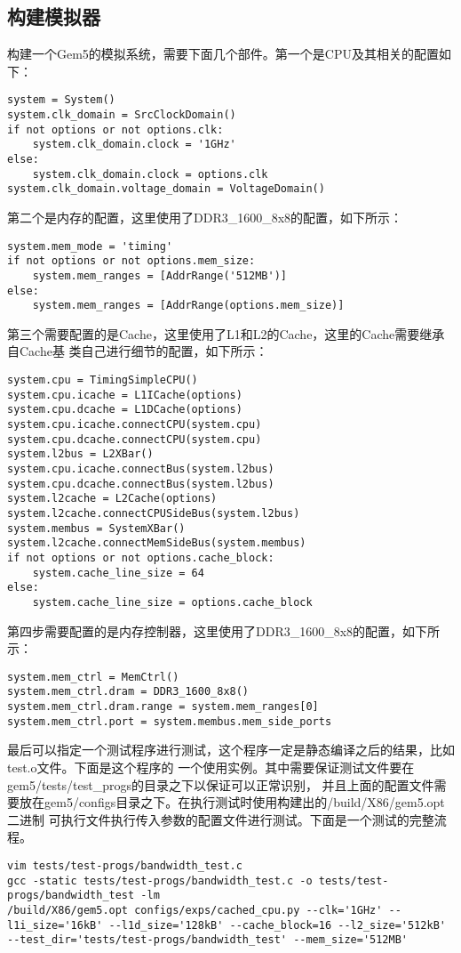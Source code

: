 \documentclass{article}
\begin{document}
\subsection{构建模拟器}
构建一个Gem5的模拟系统，需要下面几个部件。第一个是CPU及其相关的配置如下：
\begin{lstlisting}[style=pythonstyle]
system = System()
system.clk_domain = SrcClockDomain()
if not options or not options.clk:
    system.clk_domain.clock = '1GHz'
else:
    system.clk_domain.clock = options.clk
system.clk_domain.voltage_domain = VoltageDomain()
\end{lstlisting}

第二个是内存的配置，这里使用了DDR3\_1600\_8x8的配置，如下所示：
\begin{lstlisting}[style=pythonstyle]
system.mem_mode = 'timing'
if not options or not options.mem_size:
    system.mem_ranges = [AddrRange('512MB')]
else:
    system.mem_ranges = [AddrRange(options.mem_size)]
\end{lstlisting}

第三个需要配置的是Cache，这里使用了L1和L2的Cache，这里的Cache需要继承自Cache基
类自己进行细节的配置，如下所示：
\begin{lstlisting}[style=pythonstyle]
system.cpu = TimingSimpleCPU()
system.cpu.icache = L1ICache(options)
system.cpu.dcache = L1DCache(options)
system.cpu.icache.connectCPU(system.cpu)
system.cpu.dcache.connectCPU(system.cpu)
system.l2bus = L2XBar()
system.cpu.icache.connectBus(system.l2bus)
system.cpu.dcache.connectBus(system.l2bus)
system.l2cache = L2Cache(options)
system.l2cache.connectCPUSideBus(system.l2bus)
system.membus = SystemXBar()
system.l2cache.connectMemSideBus(system.membus)
if not options or not options.cache_block:
    system.cache_line_size = 64
else:
    system.cache_line_size = options.cache_block
\end{lstlisting}

第四步需要配置的是内存控制器，这里使用了DDR3\_1600\_8x8的配置，如下所示：
\begin{lstlisting}[style=pythonstyle]
system.mem_ctrl = MemCtrl()
system.mem_ctrl.dram = DDR3_1600_8x8()
system.mem_ctrl.dram.range = system.mem_ranges[0]
system.mem_ctrl.port = system.membus.mem_side_ports
\end{lstlisting}

最后可以指定一个测试程序进行测试，这个程序一定是静态编译之后的结果，比如test.o文件。下面是这个程序的
一个使用实例。其中需要保证测试文件要在gem5/tests/test\_progs的目录之下以保证可以正常识别，
并且上面的配置文件需要放在gem5/configs目录之下。在执行测试时使用构建出的/build/X86/gem5.opt二进制
可执行文件执行传入参数的配置文件进行测试。下面是一个测试的完整流程。
\begin{lstlisting}[style=bashstyle]
vim tests/test-progs/bandwidth_test.c
gcc -static tests/test-progs/bandwidth_test.c -o tests/test-progs/bandwidth_test -lm
/build/X86/gem5.opt configs/exps/cached_cpu.py --clk='1GHz' --l1i_size='16kB' --l1d_size='128kB' --cache_block=16 --l2_size='512kB' --test_dir='tests/test-progs/bandwidth_test' --mem_size='512MB'
\end{lstlisting}
\end{document}
